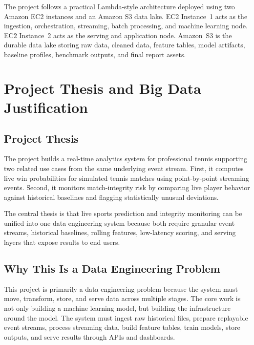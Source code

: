 \documentclass[11pt,a4paper]{article}
\begin{document}
The project follows a practical Lambda-style architecture deployed using two Amazon EC2 instances
and an Amazon S3 data lake. EC2 Instance~1 acts as the ingestion, orchestration, streaming, batch
processing, and machine learning node. EC2 Instance~2 acts as the serving and application node.
Amazon~S3 is the durable data lake storing raw data, cleaned data, feature tables, model
artifacts, baseline profiles, benchmark outputs, and final report assets.

\section{Project Thesis and Big Data Justification}

\subsection{Project Thesis}

The project builds a real-time analytics system for professional tennis supporting two related use
cases from the same underlying event stream. First, it computes live win probabilities for
simulated tennis matches using point-by-point streaming events. Second, it monitors match-integrity
risk by comparing live player behavior against historical baselines and flagging statistically
unusual deviations.

The central thesis is that live sports prediction and integrity monitoring can be unified into one
data engineering system because both require granular event streams, historical baselines, rolling
features, low-latency scoring, and serving layers that expose results to end users.

\subsection{Why This Is a Data Engineering Problem}

This project is primarily a data engineering problem because the system must move, transform,
store, and serve data across multiple stages. The core work is not only building a machine
learning model, but building the infrastructure around the model. The system must ingest raw
historical files, prepare replayable event streams, process streaming data, build feature tables,
train models, store outputs, and serve results through APIs and dashboards.
\end{document}
